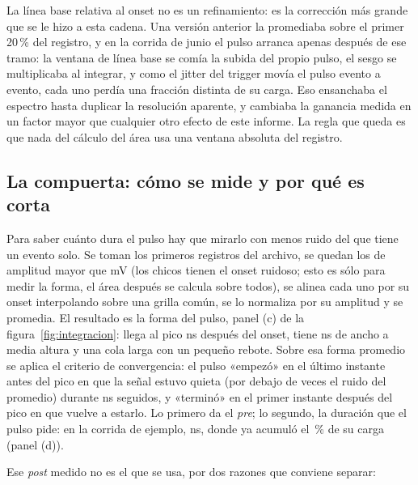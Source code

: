 \documentclass[11pt,a4paper]{article}
\begin{document}
\begin{aviso}
La línea base relativa al onset no es un refinamiento: es la corrección más
grande que se le hizo a esta cadena. Una versión anterior la promediaba sobre
el primer 20\,\% del registro, y en la corrida de junio el pulso arranca
apenas después de ese tramo: la ventana de línea base se comía la subida del
propio pulso, el sesgo se multiplicaba al integrar, y como el jitter del
trigger movía el pulso evento a evento, cada uno perdía una fracción distinta
de su carga. Eso ensanchaba el espectro hasta duplicar la resolución aparente,
y cambiaba la ganancia medida en un factor mayor que cualquier otro efecto de
este informe. La regla que queda es que nada del cálculo del área usa una
ventana absoluta del registro.
\end{aviso}

\subsection{La compuerta: cómo se mide y por qué es corta}
\label{sec:compuerta}

Para saber cuánto dura el pulso hay que mirarlo con menos ruido del que tiene
un evento solo. Se toman los primeros \NVentana{} registros del archivo, se
quedan los de amplitud mayor que \AmpMinimaForma{} mV (los chicos tienen el
onset ruidoso; esto es sólo para medir la forma, el área después se calcula
sobre todos), se alinea cada uno por su onset interpolando sobre una grilla
común, se lo normaliza por su amplitud y se promedia. El resultado es la forma
del pulso, panel (c) de la figura~\ref{fig:integracion}: llega al pico
\EjPico{} ns después del onset, tiene \EjFwhmPulso{} ns de ancho a media
altura y una cola larga con un pequeño rebote. Sobre esa forma promedio se aplica
el criterio de convergencia: el pulso «empezó» en el último instante antes del
pico en que la señal estuvo quieta (por debajo de \KConv{} veces el ruido del
promedio) durante \TramoConv{} ns seguidos, y «terminó» en el primer instante
después del pico en que vuelve a estarlo. Lo primero da el \emph{pre}; lo
segundo, la duración que el pulso pide: en la corrida de ejemplo,
\EjPostMedido{} ns, donde ya acumuló el \EjCargaPostMedido\,\% de su carga
(panel (d)).

Ese \emph{post} medido no es el que se usa, por dos razones que conviene
separar:
\end{document}
